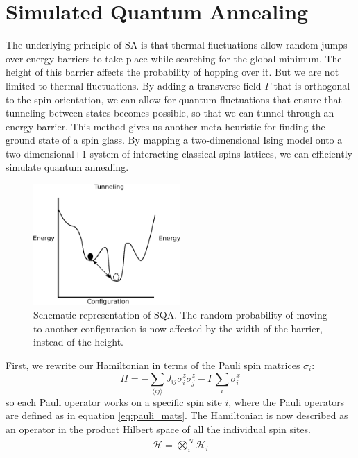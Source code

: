 \section{Simulated Quantum Annealing}

The underlying principle of SA is that thermal fluctuations allow random jumps over energy barriers to take place while searching for the global minimum. The height of this barrier affects the probability of hopping over it. But we are not limited to thermal fluctuations. By adding a transverse field $\Gamma$ that is orthogonal to the spin orientation, we can allow for quantum fluctuations that ensure that tunneling between states becomes possible, so that we can tunnel through an energy barrier. This method gives us another meta-heuristic for finding the ground state of a spin glass. By mapping a two-dimensional Ising model onto a two-dimensional+1 system of interacting classical spins lattices, we can efficiently simulate quantum annealing.
\begin{figure}[htb!]
    \centering
    \includegraphics[width=0.5\textwidth]{figures/chapter2/QA.eps}
    \caption{Schematic representation of SQA. The random probability of moving to another configuration is now affected by the width of the barrier, instead of the height.}
    \label{fig:qa}
\end{figure}
First, we rewrite our Hamiltonian in terms of the Pauli spin matrices $\sigma_i$:
\begin{equation}
    H = -\sum_{\langle ij \rangle} J_{ij} \sigma^z_i \sigma^z_j - \Gamma \sum_i \sigma^x_i
    \label{ham_EA_q}
\end{equation}
so each Pauli operator works on a specific spin site $i$, where the Pauli operators are defined as in equation \ref{eq:pauli_mats}. The Hamiltonian is now described as an operator in the product Hilbert space of all the individual spin sites.
\begin{align*}
    \mathcal{H} = \bigotimes_i^N \mathcal{H}_i
\end{align*}
